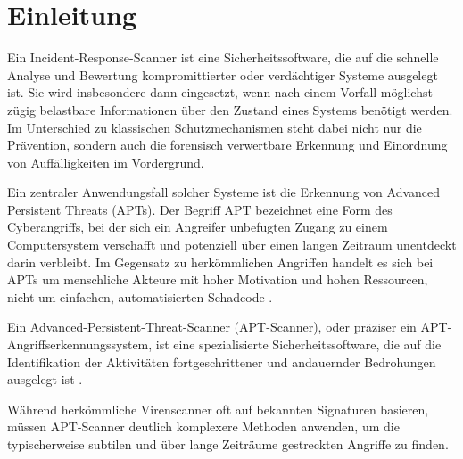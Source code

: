 \chapter{Einleitung}
\label{ch:Einleitung}



%
%
\noindent Ein Incident-Response-Scanner ist eine Sicherheitssoftware,
die auf die schnelle Analyse und Bewertung kompromittierter oder verdächtiger Systeme ausgelegt ist.
Sie wird insbesondere dann eingesetzt,
wenn nach einem Vorfall möglichst zügig belastbare Informationen über den Zustand eines Systems benötigt werden.
Im Unterschied zu klassischen Schutzmechanismen steht dabei nicht nur die Prävention,
sondern auch die forensisch verwertbare Erkennung und Einordnung von Auffälligkeiten im Vordergrund.

\vspace{7.56mm}

\noindent Ein zentraler Anwendungsfall solcher Systeme ist die Erkennung von Advanced Persistent Threats (\acs{APT}s).
Der Begriff \acs{APT} bezeichnet eine Form des Cyberangriffs,
bei der sich ein Angreifer unbefugten Zugang zu einem Computersystem verschafft
und potenziell über einen langen Zeitraum unentdeckt darin verbleibt.
Im Gegensatz zu herkömmlichen Angriffen
handelt es sich bei \acsp{APT} um menschliche Akteure
mit hoher Motivation und hohen Ressourcen,
nicht um einfachen, automatisierten Schadcode \cite[S.~1--2, 7]{Buchta:2024}.


\vspace{7.56mm}

\noindent Ein Advanced-Persistent-Threat-Scanner (\acs{APT}-Scanner), oder präziser ein \acs{APT}-Angriffserkennungssystem,
ist eine spezialisierte Sicherheitssoftware,
die auf die Identifikation der Aktivitäten fortgeschrittener und andauernder Bedrohungen ausgelegt ist \cite[S.~1--2]{Buchta:2024}.

\noindent Während herkömmliche Virenscanner oft auf bekannten Signaturen basieren,
müssen \acs{APT}-Scanner deutlich komplexere Methoden anwenden,
um die typischerweise subtilen
und über lange Zeiträume gestreckten Angriffe zu finden.

\vspace{7.56mm}

